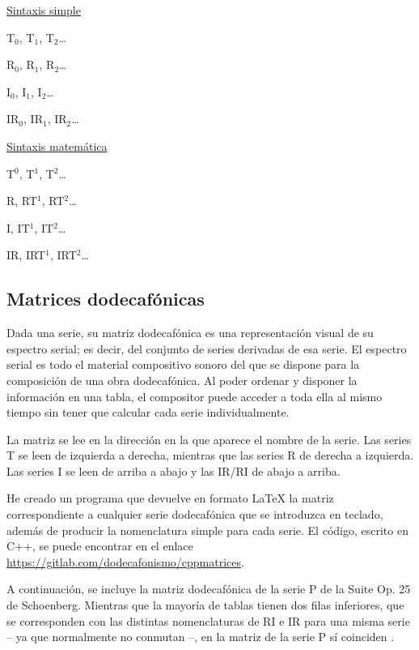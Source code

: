 		\begin{multicols}{2}
			\underline{Sintaxis simple}
			
			T$_0$, T$_1$, T$_2$\ldots
			
			R$_0$, R$_1$, R$_2$\ldots
			
			I$_0$, I$_1$, I$_2$\ldots
			
			IR$_0$, IR$_1$, IR$_2$\ldots
			
			\underline{Sintaxis matem\'atica}
			
			T$^0$, T$^1$, T$^2$\ldots
			
			R, RT$^1$, RT$^2$\ldots
			
			I, IT$^1$, IT$^2$\ldots
			
			IR, IRT$^1$, IRT$^2$\ldots
		\end{multicols}
	
	\subsection{Matrices dodecaf\'onicas}
		
		Dada una serie, su matriz dodecaf\'onica es una representaci\'on visual de su espectro serial; es decir, del conjunto de series derivadas de esa serie. El espectro serial es todo el material compositivo sonoro del que se dispone para la composici\'on de una obra dodecaf\'onica. Al poder ordenar y disponer la informaci\'on en una tabla, el compositor puede acceder a toda ella al mismo tiempo sin tener que calcular cada serie individualmente.		
		
		La matriz se lee en la direcci\'on en la que aparece el nombre de la serie. Las series T se leen de izquierda a derecha, mientras que las series R de derecha a izquierda. Las series I se leen de arriba a abajo y las IR/RI de abajo a arriba.
		
		He creado un programa que devuelve en formato \LaTeX{} la matriz correspondiente a cualquier serie dodecaf\'onica que se introduzca en teclado, adem\'as de producir la nomenclatura simple para cada serie. El c\'odigo, escrito en C++, %
		se puede encontrar en el enlace \url{https://gitlab.com/dodecafonismo/cppmatrices}.
		
		A continuaci\'on, se incluye la matriz dodecaf\'onica de la serie P de la Suite Op. 25 de Schoenberg. Mientras que la mayor\'ia de tablas tienen dos filas inferiores, que se corresponden con las distintas nomenclaturas de RI e IR para una misma serie -- ya que normalmente no conmutan --, en la matriz de la serie P s\'i coinciden%
		.
		
